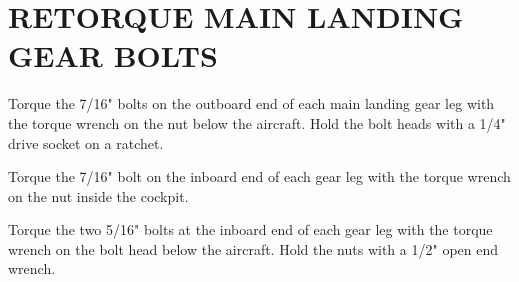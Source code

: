 \section{RETORQUE MAIN LANDING GEAR BOLTS}
  \begin{enumerate*}
    \item Torque the 7/16" bolts on the outboard end of each main landing gear leg with the torque wrench on the nut below the aircraft.  Hold the bolt heads with a 1/4" drive socket on a ratchet. 
    \item Torque the 7/16" bolt on the inboard end of each gear leg with the torque wrench on the nut inside the cockpit.  
    \item Torque the two 5/16" bolts at the inboard end of each gear leg with the torque wrench on the bolt head below the aircraft.  Hold the nuts with a 1/2" open end wrench.  
\end{enumerate*}


